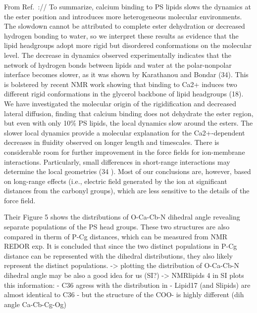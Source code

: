 \documentclass[journal=jpcbfk,manuscript=article]{achemso}
\begin{document}
From Ref.~\cite{valentine18}://
To summarize, calcium binding to PS lipids slows the dynamics at the ester position and introduces more heterogeneous molecular environments. 
The slowdown cannot be attributed to complete ester dehydration or decreased hydrogen bonding to water, so we interpret these results as evidence that the lipid headgroups adopt more rigid but disordered conformations on the molecular level. 
The decrease in dynamics observed experimentally indicates that the network of hydrogen bonds between lipids and water at the polar-nonpolar interface becomes slower, as it was shown by Karathanou and Bondar (34). 
This is bolstered by recent NMR work showing that binding to Ca2+ induces two different rigid conformations in the glycerol backbone of lipid headgroups (18).
We have investigated the molecular origin of the rigidification and decreased lateral diffusion, finding that calcium binding does not dehydrate the ester region, but even with only 10\% PS lipids, the local dynamics slow around the esters. The slower local dynamics provide a molecular explanation for the Ca2+-dependent decreases in fluidity observed on longer length and timescales.
There is considerable room for further improvement in the force fields for ion-membrane interactions. Particularly, small differences in short-range interactions may determine the local geometries (34
). Most of our conclusions are, however, based on long-range effects (i.e., electric field generated by the ion at significant distances from the carbonyl groups), which are less sensitive to the details of the force field. 



Their Figure 5 \cite{hallock18} shows the distributions of O-Ca-Cb-N dihedral angle
revealing separate populations of the PS head groups. 
These two structures are also compared in therm of P-Cg distances, 
which can be measured from NMR REDOR exp. 
It is concluded that since the two distinct populations in P-Cg distance can be represented with the 
dihedral distributions, 
they also likely represent the distinct populations. 
 -> plotting the distribution of O-Ca-Cb-N dihedral angle may be also a good idea for us (SI?)
     -> NMRlipids 4 in SI \cite{nmrlipids_proj4} plots this information: 
           - C36 agress with the distribution in \cite{hallock18}
           - Lipid17 (and Slipids) are almost identical to C36
           - but the structure of the COO- is highly different (dih angle Ca-Cb-Cg-Og)
\end{document}
